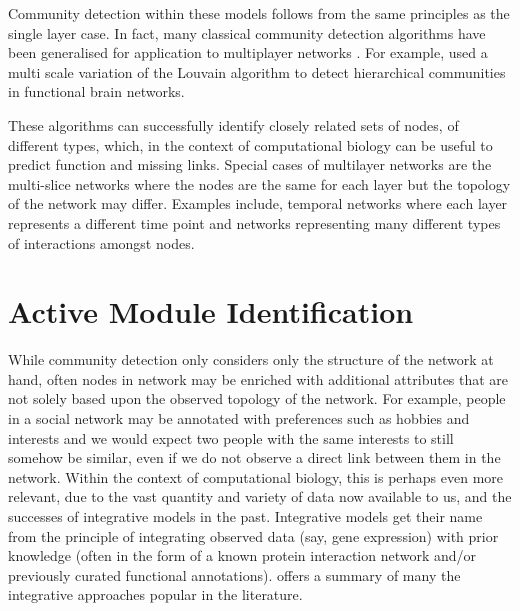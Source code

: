 \documentclass{report}
\begin{document}
	Community detection within these models follows from the same principles as the single layer case. In fact, many classical community detection algorithms have been generalised for application to multiplayer networks \cite{mucha2010community}. For example, \cite{ashourvan2017multi} used a multi scale variation of the Louvain algorithm to detect hierarchical communities in functional brain networks. 
	
	These algorithms can successfully identify closely related sets of nodes, of different types, which, in the context of computational biology can be useful to predict function and missing links. Special cases of multilayer networks are the multi-slice networks where the nodes are the same for each layer but the topology of the network may differ. Examples include, temporal networks where each layer represents a different time point and networks representing many different types of interactions amongst nodes. 
	
	\section{Active Module Identification}
	
	While community detection only considers only the structure of the network at hand, often nodes in network may be enriched with additional attributes that are not solely based upon the observed topology of the network. For example, people in a social network may be annotated with preferences such as hobbies and interests and we would expect two people with the same interests to still somehow be similar, even if we do not observe a direct link between them in the network. Within the context of computational biology, this is perhaps even more relevant, due to the vast quantity and variety of data now available to us, and the successes of integrative models in the past. Integrative models get their name from the principle of integrating observed data (say, gene expression) with prior knowledge (often in the form of a known protein interaction network and/or previously curated functional annotations). \cite{mitra2013integrative} offers a summary of many the integrative approaches popular in the literature.
	
\end{document}
